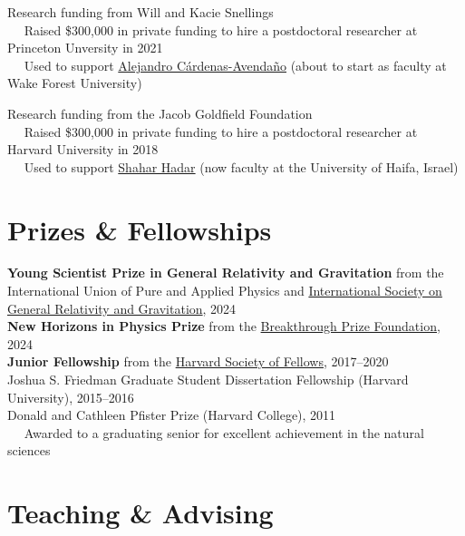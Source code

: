 \documentclass[margin,line]{resume}
\begin{document}
\begin{resume}
Research funding from Will and Kacie Snellings \\
	\mbox{ }\mbox{ } Raised \$300,000 in private funding to hire a postdoctoral researcher at Princeton Unversity in 2021 \\
	\mbox{ }\mbox{ } Used to support \href{https://cardenas.sites.wfu.edu/about-me/}{Alejandro C\'ardenas-Avenda\~no} (about to start as faculty at Wake Forest University)

Research funding from the Jacob Goldfield Foundation \\
	\mbox{ }\mbox{ } Raised \$300,000 in private funding to hire a postdoctoral researcher at Harvard University in 2018 \\
	\mbox{ }\mbox{ } Used to support \href{https://cris.haifa.ac.il/en/persons/shahar-hadar}{Shahar Hadar} (now faculty at the University of Haifa, Israel)
	
\section{\mysidestyle Prizes \& Fellowships}

\textbf{Young Scientist Prize in General Relativity and Gravitation} from the International Union of Pure and Applied Physics and \href{http://www.isgrg.org/IUPAPprize.php}{International Society on General Relativity and Gravitation}, 2024
%
\vspace{2mm} \\
\textbf{New Horizons in Physics Prize} from the \href{https://breakthroughprize.org/Laureates/L3970}{Breakthrough Prize Foundation}, 2024
\vspace{2mm} \\
%
\textbf{Junior Fellowship} from the \href{https://socfell.fas.harvard.edu/listed-term-0}{Harvard Society of Fellows}, 2017--2020
\vspace{2mm} \\
%
Joshua S. Friedman Graduate Student Dissertation Fellowship (Harvard University), 2015--2016
\vspace{2mm} \\
Donald and Cathleen Pfister Prize (Harvard College), 2011\\
	\mbox{ }\mbox{ } Awarded to a graduating senior for excellent achievement in the natural sciences

\clearpage

\section{\mysidestyle Teaching \& Advising}


\end{resume}
\end{document}
